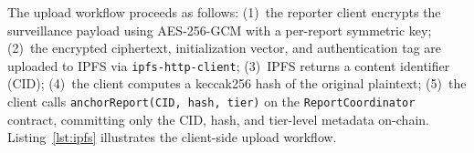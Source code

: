\documentclass[AMA,LATO1COL]{WileyNJD-v2}
\begin{document}
%
%

The upload workflow proceeds as follows: (1)~the reporter client encrypts the surveillance payload using AES-256-GCM with a per-report symmetric key; (2)~the encrypted ciphertext, initialization vector, and authentication tag are uploaded to IPFS via \texttt{ipfs-http-client}; (3)~IPFS returns a content identifier (CID); (4)~the client computes a keccak256 hash of the original plaintext; (5)~the client calls \texttt{anchorReport(CID, hash, tier)} on the \texttt{ReportCoordinator} contract, committing only the CID, hash, and tier-level metadata on-chain. Listing~\ref{lst:ipfs} illustrates the client-side upload workflow.
\end{document}
